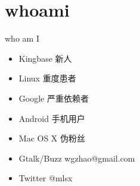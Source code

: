\section*{whoami}
\begin{frame}{who am I}
\begin{itemize}
\item Kingbase 新人
\item Linux 重度患者
\item Google 严重依赖者
\item Android 手机用户
\item Mac OS X 伪粉丝
\item Gtalk/Buzz   wgzhao@gmail.com
\item Twitter   @mlsx
\end{itemize}
\end{frame}